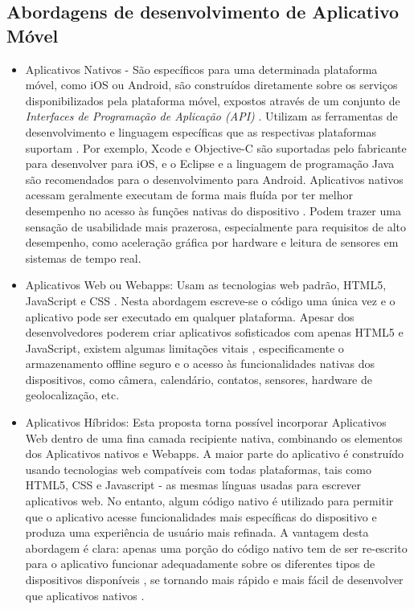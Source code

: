 \subsection{Abordagens de desenvolvimento de Aplicativo Móvel}

\begin{itemize}
    \item Aplicativos Nativos - São específicos para uma determinada plataforma móvel, como iOS ou Android, são construídos diretamente sobre os serviços disponibilizados pela plataforma móvel, expostos através de um conjunto de \textit{Interfaces de Programação de Aplicação (API)} \cite{book:fling}. Utilizam as ferramentas de desenvolvimento e linguagem específicas que as respectivas plataformas suportam \cite{article:malovolta}. Por exemplo, Xcode e Objective-C são suportadas pelo fabricante para desenvolver para iOS, e o Eclipse e a linguagem de programação Java são recomendados para o desenvolvimento para Android. Aplicativos nativos acessam geralmente executam de forma mais fluída por ter melhor desempenho no acesso às funções nativas do dispositivo \cite{article:corral}. Podem trazer uma sensação de usabilidade mais prazerosa, especialmente para requisitos de alto desempenho, como aceleração gráfica por hardware e leitura de sensores em sistemas de tempo real.
    \item Aplicativos Web ou Webapps: Usam as tecnologias web padrão, HTML5, JavaScript e CSS \cite{article:rahul}. Nesta abordagem escreve-se o código uma única vez e o aplicativo pode ser executado em qualquer plataforma. Apesar dos desenvolvedores poderem criar aplicativos sofisticados com apenas HTML5 e JavaScript, existem algumas limitações vitais \cite{article:rahul}\cite{article:spyros}, especificamente o armazenamento offline seguro e o acesso às funcionalidades nativas dos dispositivos, como câmera, calendário, contatos, sensores, hardware de geolocalização, etc.
    \item Aplicativos Híbridos: Esta proposta torna possível incorporar Aplicativos Web dentro de uma fina camada recipiente nativa, combinando os elementos dos Aplicativos nativos e Webapps. A maior parte do aplicativo é construído usando tecnologias web compatíveis com todas plataformas, tais como HTML5, CSS e Javascript - as mesmas línguas usadas para escrever aplicativos web. No entanto, algum código nativo é utilizado para permitir que o aplicativo acesse funcionalidades mais específicas do dispositivo e produza uma experiência de usuário mais refinada. A vantagem desta abordagem é clara: apenas uma porção do código nativo tem de ser re-escrito para o aplicativo funcionar adequadamente sobre os diferentes tipos de dispositivos disponíveis \cite{book:wargo}, se tornando mais rápido e mais fácil de desenvolver que aplicativos nativos \cite{article:ibm}.
\end{itemize}

